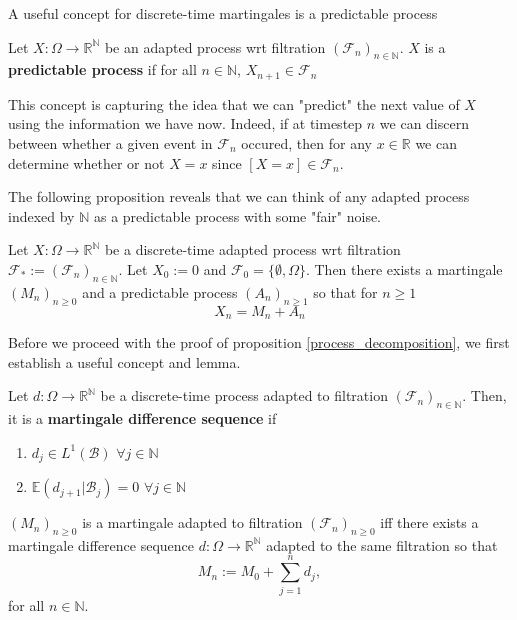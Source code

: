 A useful concept for discrete-time martingales is a predictable process

\begin{definition}
    Let $X: \Omega \to \mathbb{R}^{\mathbb{N}}$ be an adapted process wrt filtration $(\mathcal{F}_{n})_{n \in \mathbb{N}}$. \(X\) is a \textbf{predictable process} if for all \(n \in \mathbb{N}\), \(X_{n+1} \in \mathcal{F}_{n}\)
\end{definition}

This concept is capturing the idea that we can "predict" the next value of \(X\) using the information we have now. Indeed, if at timestep \(n\) we can discern between whether a given event in \(\mathcal{F}_{n}\) occured, then for any \(x \in \mathbb{R}\) we can determine whether or not \(X = x\) since \([X=x] \in \mathcal{F}_{n}\).

The following proposition reveals that we can think of any adapted process indexed by \(\mathbb{N}\) as a predictable process with some "fair" noise.

\begin{proposition}
    \label{process_decomposition}
    Let $X: \Omega \to \mathbb{R}^{\mathbb{N}}$ be a discrete-time adapted process wrt filtration $\mathcal{F}_{*} := (\mathcal{F}_{n})_{n \in \mathbb{N}}$. Let \(X_{0} := 0\) and \(\mathcal{F}_{0} = \{\emptyset, \Omega\}\). Then there exists a martingale \((M_{n})_{n \geq 0}\) and a predictable process \((A_{n})_{n \geq 1}\) so that for \(n \geq 1\)
    \[X_{n} = M_{n} + A_{n}\]
\end{proposition}

Before we proceed with the proof of proposition \ref{process_decomposition}, we first establish a useful concept and lemma.

\begin{definition}
    \label{difference_defn}
    Let $d: \Omega \to \mathbb{R}^{\mathbb{N}}$ be a discrete-time process adapted to filtration $(\mathcal{F}_{n})_{n \in \mathbb{N}}$. Then, it is a \textbf{martingale difference sequence} if
    \begin{enumerate}
        \item $d_{j} \in L^{1}(\mathcal{B})$ $\forall j \in \mathbb{N}$
        \item $\mathbb{E}(d_{j+1} | \mathcal{B}_{j}) = 0$ \(\forall j \in \mathbb{N}\)
    \end{enumerate}
\end{definition}

\begin{lemma}
    \((M_{n})_{n \geq 0}\) is a martingale adapted to filtration \((\mathcal{F}_{n})_{n \geq 0}\) iff there exists a martingale difference sequence $d: \Omega \to \mathbb{R}^{\mathbb{N}}$ adapted to the same filtration so that
    \[M_{n} := M_{0} + \sum\limits_{j=1}^{n} d_{j},\]
    for all \(n \in \mathbb{N}\).
\end{lemma}

